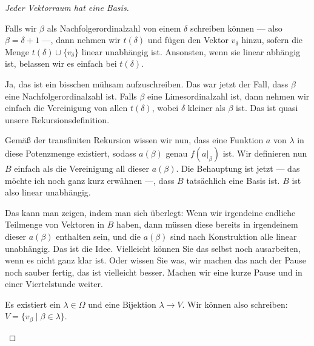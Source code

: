 \begin{proof}[Jeder Vektorraum hat eine Basis]
\begin{ai-global-state-checkpoint-invisible-content}
\end{ai-global-state-checkpoint-invisible-content}

\begin{spoken-clean}[00:42:40 - 00:44:40]
Falls wir $\beta$ als Nachfolgerordinalzahl von einem $\delta$ schreiben können --- also $\beta = \delta+1$ ---, dann nehmen wir $t(\delta)$ und fügen den Vektor $v_\delta$ hinzu, sofern die Menge $t(\delta) \cup \{v_\delta\}$ linear unabhängig ist. Ansonsten, wenn sie linear abhängig ist, belassen wir es einfach bei $t(\delta)$.
\end{spoken-clean}

\begin{spoken-clean}[00:44:40 - 00:45:25]
Ja, das ist ein bisschen mühsam aufzuschreiben. Das war jetzt der Fall, dass $\beta$ eine Nachfolgerordinalzahl ist. Falls $\beta$ eine Limesordinalzahl ist, dann nehmen wir einfach die Vereinigung von allen $t(\delta)$, wobei $\delta$ kleiner als $\beta$ ist. Das ist quasi unsere Rekursionsdefinition.

Gemäß der transfiniten Rekursion wissen wir nun, dass eine Funktion $a$ von $\lambda$ in diese Potenzmenge existiert, sodass $a(\beta)$ genau $f(a|_\beta)$ ist. Wir definieren nun $B$ einfach als die Vereinigung all dieser $a(\beta)$. Die Behauptung ist jetzt --- das möchte ich noch ganz kurz erwähnen ---, dass $B$ tatsächlich eine Basis ist. $B$ ist also linear unabhängig.

Das kann man zeigen, indem man sich überlegt: Wenn wir irgendeine endliche Teilmenge von Vektoren in $B$ haben, dann müssen diese bereits in irgendeinem dieser $a(\beta)$ enthalten sein, und die $a(\beta)$ sind nach Konstruktion alle linear unabhängig. Das ist die Idee. Vielleicht können Sie das selbst noch ausarbeiten, wenn es nicht ganz klar ist. Oder wissen Sie was, wir machen das nach der Pause noch sauber fertig, das ist vielleicht besser. Machen wir eine kurze Pause und in einer Viertelstunde weiter.
\end{spoken-clean}

\begin{math-stroke}
\begin{short-proof}
Es existiert ein $\lambda \in \Omega$ und eine Bijektion $\lambda \to V$.
Wir können also schreiben: $V = \{ v_\beta \mid \beta \in \lambda \}$.


\end{short-proof}
\end{math-stroke}
\end{proof}
